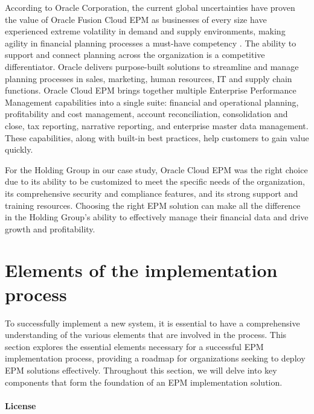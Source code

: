 \documentclass[12pt,a4paper,openright,twoside]{book}
\begin{document}
According to Oracle Corporation, the current global uncertainties have proven the value of Oracle Fusion Cloud EPM as businesses of every size have experienced extreme volatility in demand and supply environments, making agility in financial planning processes a must-have competency \cite{toomey2022oracle}.
%
The ability to support and connect planning across the organization is a competitive differentiator. 
%
Oracle delivers purpose-built solutions to streamline and manage planning processes in sales, marketing, human resources, IT and supply chain functions.
%
Oracle Cloud EPM brings together multiple Enterprise Performance Management capabilities into a single suite: financial and operational planning, profitability and cost management, account reconciliation, consolidation and close, tax reporting, narrative reporting, and enterprise master data management. 
%
These capabilities, along with built-in best practices, help customers to gain value quickly.

For the Holding Group in our case study, Oracle Cloud EPM was the right choice due to its ability to be customized to meet the specific needs of the organization, its comprehensive security and compliance features, and its strong support and training resources.
%
Choosing the right EPM solution can make all the difference in the Holding Group's ability to effectively manage their financial data and drive growth and profitability.

\section{Elements of the implementation process}

To successfully implement a new system, it is essential to have a comprehensive understanding of the various elements that are involved in the process. 
%
This section explores the essential elements necessary for a successful EPM implementation process, providing a roadmap for organizations seeking to deploy EPM solutions effectively.
%
Throughout this section, we will delve into key components that form the foundation of an EPM implementation solution. 

\paragraph{License}
\end{document}

